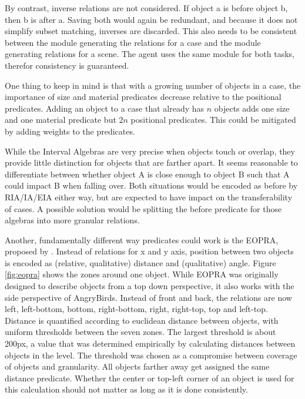 By contrast, inverse relations are not considered. If object a is before object b, then b is after a. Saving both would again be redundant, and because it does not simplify subset matching, inverses are discarded. This also needs to be consistent between the module generating the relations for a case and the module generating relations for a scene. The agent uses the same module for both tasks, therefor consistency is guaranteed.

One thing to keep in mind is that with a growing number of objects in a case, the importance of size and material predicates decrease relative to the positional predicates. Adding an object to a case that already has $n$ objects adds one size and one material predicate but $2n$ positional predicates. This could be mitigated by adding weights to the predicates.

While the Interval Algebras are very precise when objects touch or overlap, they provide little distinction for objects that are farther apart. It seems reasonable to differentiate between whether object A is close enough to object B such that A could impact B when falling over. Both situations would be encoded as before by RIA/IA/EIA either way, but are expected to have impact on the transferability of cases.
A possible solution would be splitting the before predicate for those algebras into more granular relations.

Another, fundamentally different way predicates could work is the \ac{EOPRA}, proposed by \cite{EOPRA-Perico2016CollaborativeCO}. Instead of relations for x and y axis, position between two objects is encoded as (relative, qualitative) distance and (qualitative) angle.
Figure \ref{fig:eopra} shows the zones around one object. While \ac{EOPRA} was originally designed to describe objects from a top down perspective, it also works with the side perspective of AngryBirds.
Instead of front and back, the relations are now left, left-bottom, bottom, right-bottom, right, right-top, top and left-top.
Distance is quantified according to euclidean distance between objects, with uniform thresholds between the seven zones. The largest threshold is about 200px, a value that was determined empirically by calculating distances between objects in the level. The threshold was chosen as a compromise between coverage of objects and granularity.
All objects farther away get assigned the same distance predicate. Whether the center or top-left corner of an object is used for this calculation should not matter as long as it is done consistently.


